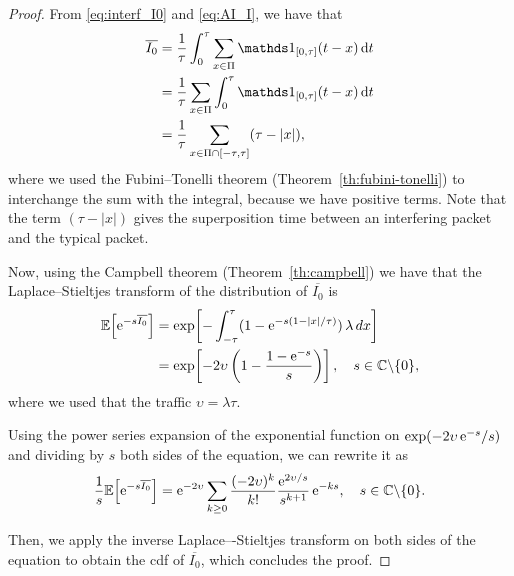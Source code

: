 \begin{proof}
    From \eqref{eq:interf_I0} and \eqref{eq:AI_I}, we have that
    \begin{align*}\label{eq:AI_I}
        \overline{I_0} 
            &= \frac{1}{\tau}\int_0^\tau \sum_{x\in\Pi} \ind_{[0,\tau]}(t-x)\,\d t \\
            &= \frac{1}{\tau}\sum_{x\in\Pi} \int_0^\tau  \ind_{[0,\tau]}(t-x)\,\d t \\
            &= \frac{1}{\tau}\sum_{x\in\Pi\cap[-\tau,\tau]} (\tau - |x|),
    \end{align*}
    where we used the Fubini--Tonelli theorem (Theorem~\ref{th:fubini-tonelli}) to interchange the sum with the integral, because we have positive terms.
    Note that the term $(\tau - |x|)$ gives the superposition time between an interfering packet and the typical packet.
    
    Now, using the Campbell theorem (Theorem~\ref{th:campbell}) we have that the Laplace--Stieltjes transform of the distribution of $\overline{I_0}$ is
    \begin{align*}
    	{\mathbb E}\!\left[\mathrm{e}^{-s \overline{I_0}}\right]	&= \exp\!\left[ -\int_{-\tau}^\tau(1-\mathrm{e}^{-s(1-|x|/\tau)}) \,\lambda\,dx \right] \\
        				&= \exp\!\left[ -2\upsilon\left( 1 - \frac{1-\mathrm{e}^{-s}}{s} \right) \right],\quad s\in{\mathbb C} \backslash \{0\},
    \end{align*}
    where we used that the traffic $\upsilon = \lambda\tau$.
    
    Using the power series expansion of the exponential function on $\exp(-2\upsilon\,\mathrm{e}^{-s}/s)$ and dividing by $s$ both sides of the equation, we can rewrite it as
    \begin{equation*}
    	\frac{1}{s}{\mathbb E}\!\left[\mathrm{e}^{-s \overline{I_0}}\right] = \mathrm{e}^{-2\upsilon} \sum_{k\geq0} \frac{(-2\upsilon)^k}{k!} \frac{\mathrm{e}^{2\upsilon/s}}{s^{k+1}}\,\mathrm{e}^{-k s},\quad s\in{\mathbb C} \backslash \{0\}.
    \end{equation*}
    
    Then, we apply the inverse Laplace–-Stieltjes transform on both sides of the equation to obtain the cdf of $\overline{I_0}$, which concludes the proof.
\end{proof}

